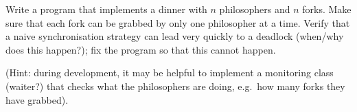 \documentclass{article}
\begin{document}
Write a program that implements a dinner with $n$ philosophers and $n$
forks. Make sure that each fork can be grabbed by only one philosopher
at a time. Verify that a naive synchronisation strategy can lead very
quickly to a deadlock (when/why does this happen?); 
fix the program so that this cannot happen. 

(Hint: during development, it may be helpful to implement a monitoring
class (waiter?)  that checks what the philosophers are doing, e.g.~how
many forks they have grabbed).
\end{document}
